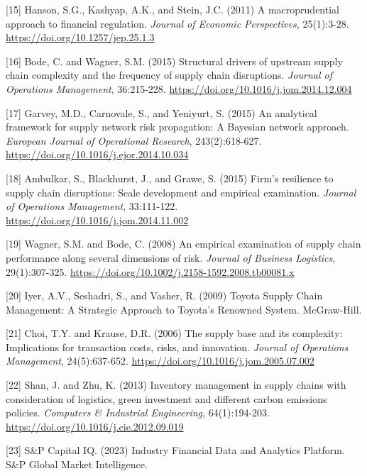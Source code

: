 \documentclass[a4 paper, 11pt,twoside]{article}
\newcommand{\0}{\Bf{0}}
\theoremstyle{definition}
\begin{document}
{\begin{thebibliography}{8}
{\label{ref15}[15] Hanson, S.G., Kashyap, A.K., and Stein, J.C. (2011) A macroprudential approach to financial regulation. \emph{Journal of Economic Perspectives}, 25(1):3-28. \href{https://doi.org/10.1257/jep.25.1.3}{https://doi.org/10.1257/jep.25.1.3}

\label{ref16}[16] Bode, C. and Wagner, S.M. (2015) Structural drivers of upstream supply chain complexity and the frequency of supply chain disruptions. \emph{Journal of Operations Management}, 36:215-228. \href{https://doi.org/10.1016/j.jom.2014.12.004}{https://doi.org/10.1016/j.jom.2014.12.004}

\label{ref17}[17] Garvey, M.D., Carnovale, S., and Yeniyurt, S. (2015) An analytical framework for supply network risk propagation: A Bayesian network approach. \emph{European Journal of Operational Research}, 243(2):618-627. \href{https://doi.org/10.1016/j.ejor.2014.10.034}{https://doi.org/10.1016/j.ejor.2014.10.034}

\label{ref18}[18] Ambulkar, S., Blackhurst, J., and Grawe, S. (2015) Firm's resilience to supply chain disruptions: Scale development and empirical examination. \emph{Journal of Operations Management}, 33:111-122. \href{https://doi.org/10.1016/j.jom.2014.11.002}{https://doi.org/10.1016/j.jom.2014.11.002}

\label{ref19}[19] Wagner, S.M. and Bode, C. (2008) An empirical examination of supply chain performance along several dimensions of risk. \emph{Journal of Business Logistics}, 29(1):307-325. \href{https://doi.org/10.1002/j.2158-1592.2008.tb00081.x}{https://doi.org/10.1002/j.2158-1592.2008.tb00081.x}

\label{ref20}[20] Iyer, A.V., Seshadri, S., and Vasher, R. (2009) Toyota Supply Chain Management: A Strategic Approach to Toyota's Renowned System. McGraw-Hill.

\label{ref21}[21] Choi, T.Y. and Krause, D.R. (2006) The supply base and its complexity: Implications for transaction costs, risks, and innovation. \emph{Journal of Operations Management}, 24(5):637-652. \href{https://doi.org/10.1016/j.jom.2005.07.002}{https://doi.org/10.1016/j.jom.2005.07.002}

\label{ref22}[22] Shan, J. and Zhu, K. (2013) Inventory management in supply chains with consideration of logistics, green investment and different carbon emissions policies. \emph{Computers \& Industrial Engineering}, 64(1):194-203. \href{https://doi.org/10.1016/j.cie.2012.09.019}{https://doi.org/10.1016/j.cie.2012.09.019}

\label{ref23}[23] S\&P Capital IQ. (2023) Industry Financial Data and Analytics Platform. S\&P Global Market Intelligence.

}
\end{thebibliography}}
\end{document}
